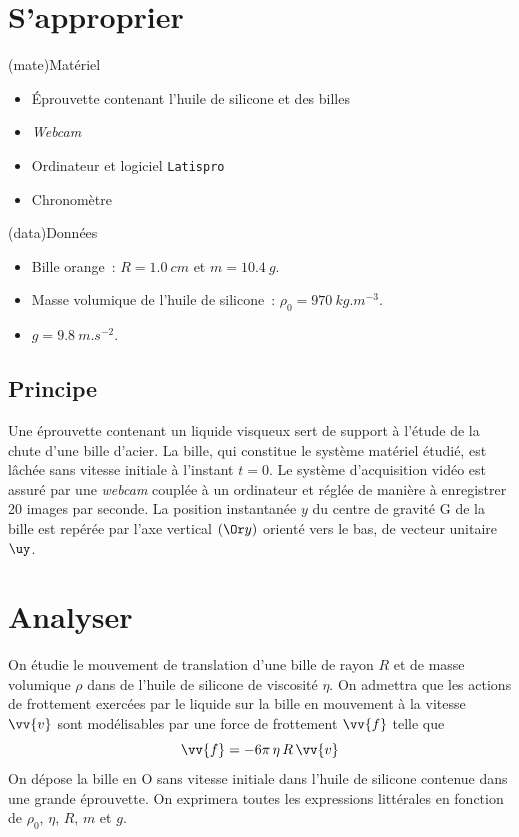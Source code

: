\documentclass[../main/main.tex]{subfiles}
\begin{document}
{	\section{S'approprier}
	\begin{tcb}(mate){Matériel}
		\begin{itemize}
			\item Éprouvette contenant l'huile de silicone et des billes
			\item \textit{Webcam}
			\item Ordinateur et logiciel \texttt{Latispro}
			\item Chronomètre
		\end{itemize}
	\end{tcb}
	\begin{tcb}(data){Données}
		\begin{itemize}
			\item Bille orange~: $R = \SI{1,0}{cm}$ et $m = \SI{10,4}{g}$.
			\item Masse volumique de l'huile de silicone~: $\rho_0 =
				      \SI{970}{kg.m^{-3}}$.
			\item $g = \SI{9,8}{m.s^{-2}}$.
		\end{itemize}
	\end{tcb}
	\subsection{Principe}
	Une éprouvette contenant un liquide visqueux sert de support à l'étude de la
	chute d'une bille d'acier. La bille, qui constitue le système matériel étudié,
	est lâchée sans vitesse initiale à l'instant $t = 0$.
	\bigbreak
	Le système d'acquisition vidéo est assuré par une \textit{webcam} couplée à un
	ordinateur et réglée de manière à enregistrer 20 images par seconde. La
	position instantanée $y$ du centre de gravité G de la bille est repérée par
	l'axe vertical $(\Or y)$ orienté vers le bas, de vecteur unitaire $\uy$.
}

\setcounter{section}{2}
\section{Analyser}

On étudie le mouvement de translation d'une bille de rayon $R$ et de masse
volumique $\rho$ dans de l'huile de silicone de viscosité $\eta$. On admettra
que les actions de frottement exercées par le liquide sur la bille en mouvement
à la vitesse $\vv{v}$ sont modélisables par une force de frottement
$\vv{f}$ telle que
\[
	\vv{f} = -6\pi \,\eta \, R \, \vv{v}
\]
\bigbreak
On dépose la bille en O sans vitesse initiale dans l'huile de silicone contenue
dans une grande éprouvette. On exprimera  toutes les expressions littérales en
fonction de $\rho_0$, $\eta$, $R$, $m$ et $g$.
\end{document}
